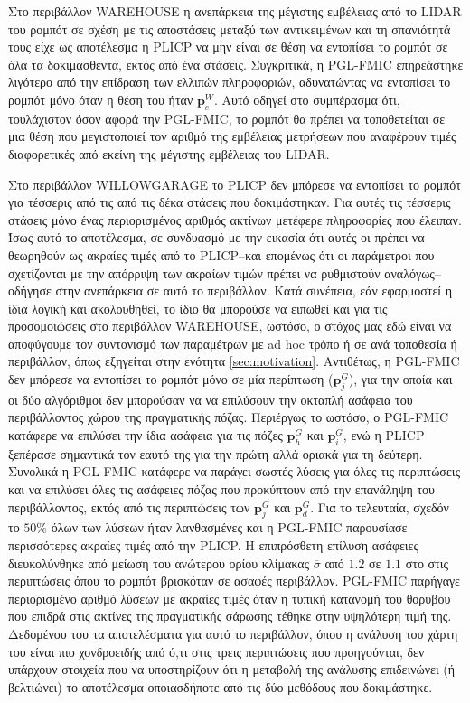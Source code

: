 Στο περιβάλλον WAREHOUSE η ανεπάρκεια της μέγιστης εμβέλειας από το LIDAR του ρομπότ
σε σχέση με τις αποστάσεις μεταξύ των αντικειμένων και τη σπανιότητά τους
είχε ως αποτέλεσμα η PLICP να μην είναι σε θέση να εντοπίσει το ρομπότ σε όλα τα δοκιμασθέντα, εκτός από ένα
στάσεις. Συγκριτικά, η PGL-FMIC επηρεάστηκε λιγότερο από την επίδραση των ελλιπών
πληροφοριών, αδυνατώντας να εντοπίσει το ρομπότ μόνο όταν η θέση του ήταν
$\bm{p}_e^W$. Αυτό οδηγεί στο συμπέρασμα ότι, τουλάχιστον όσον αφορά την PGL-FMIC,
το ρομπότ θα πρέπει να τοποθετείται σε μια θέση που μεγιστοποιεί τον αριθμό της εμβέλειας
μετρήσεων που αναφέρουν τιμές διαφορετικές από εκείνη της μέγιστης εμβέλειας του LIDAR.

Στο περιβάλλον WILLOWGARAGE το PLICP δεν μπόρεσε να εντοπίσει το ρομπότ για τέσσερις από τις
από τις δέκα στάσεις που δοκιμάστηκαν. Για αυτές τις τέσσερις στάσεις μόνο ένας περιορισμένος αριθμός ακτίνων μετέφερε
πληροφορίες που έλειπαν. Ίσως αυτό το αποτέλεσμα, σε συνδυασμό με την εικασία ότι αυτές οι
πρέπει να θεωρηθούν ως ακραίες τιμές από το PLICP--και επομένως ότι οι παράμετροι
που σχετίζονται με την απόρριψη των ακραίων τιμών πρέπει να ρυθμιστούν αναλόγως-- οδήγησε στην
ανεπάρκεια σε αυτό το περιβάλλον. Κατά συνέπεια, εάν εφαρμοστεί η ίδια λογική και
ακολουθηθεί, το ίδιο θα μπορούσε να ειπωθεί και για τις προσομοιώσεις στο περιβάλλον WAREHOUSE,
ωστόσο, ο στόχος μας εδώ είναι να αποφύγουμε τον συντονισμό των παραμέτρων με ad hoc τρόπο ή σε
ανά τοποθεσία ή περιβάλλον, όπως εξηγείται στην ενότητα
\ref{sec:motivation}. Αντιθέτως, η PGL-FMIC δεν μπόρεσε να εντοπίσει το ρομπότ
μόνο σε μία περίπτωση ($\bm{p}_j^G$), για την οποία και οι δύο αλγόριθμοι δεν μπορούσαν να
να επιλύσουν την οκταπλή ασάφεια του περιβάλλοντος χώρου της πραγματικής πόζας. Περιέργως το
ωστόσο, ο PGL-FMIC κατάφερε να επιλύσει την ίδια ασάφεια για τις πόζες $\bm{p}_h^G$
και $\bm{p}_i^G$, ενώ η PLICP ξεπέρασε σημαντικά τον εαυτό της για την πρώτη
αλλά οριακά για τη δεύτερη. Συνολικά η PGL-FMIC κατάφερε να παράγει σωστές
λύσεις για όλες τις περιπτώσεις και να επιλύσει όλες τις ασάφειες πόζας που προκύπτουν από την επανάληψη
του περιβάλλοντος, εκτός από τις περιπτώσεις των $\bm{p}_j^G$ και $\bm{p}_d^G$. Για το
τελευταία, σχεδόν το $50\%$ όλων των λύσεων ήταν λανθασμένες και η PGL-FMIC παρουσίασε περισσότερες
ακραίες τιμές από την PLICP. Η επιπρόσθετη επίλυση ασάφειες διευκολύνθηκε από
μείωση του ανώτερου ορίου κλίμακας $\overline{\sigma}$ από $1.2$ σε $1.1$ στο
στις περιπτώσεις όπου το ρομπότ βρισκόταν σε ασαφές περιβάλλον. PGL-FMIC
παρήγαγε περιορισμένο αριθμό λύσεων με ακραίες τιμές όταν η τυπική κατανομή
του θορύβου που επιδρά στις ακτίνες της πραγματικής σάρωσης τέθηκε στην υψηλότερη τιμή της. Δεδομένου του
τα αποτελέσματα για αυτό το περιβάλλον, όπου η ανάλυση του χάρτη του είναι πιο χονδροειδής
από ό,τι στις τρεις περιπτώσεις που προηγούνται, δεν υπάρχουν στοιχεία που να υποστηρίζουν ότι
η μεταβολή της ανάλυσης επιδεινώνει (ή βελτιώνει) το αποτέλεσμα οποιασδήποτε από τις δύο μεθόδους
που δοκιμάστηκε.

